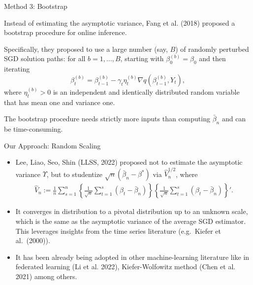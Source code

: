 \documentclass[beamer, t]{beamer}
\newcommand{\tcb}{\textcolor{blue}}
\begin{document}
\begin{frame}{Method 3: Bootstrap}


Instead of estimating the asymptotic variance, Fang et al. (2018) proposed a  bootstrap procedure  for  online inference.

\bigskip
Specifically, they proposed to use a large number (say, $B$) of randomly perturbed
SGD solution paths: for all $b = 1, \ldots, B$, starting with $\beta_0^{(b)} = \beta_0$ and then iterating
\begin{equation*}
\beta_{t}^{(b)}=\beta_{t-1}^{(b)}-\gamma_{t} \eta_t^{(b)} \nabla q\left(\beta_{t-1}^{(b)},Y_{t}\right),
\label{eq:SGD1:bt}
\end{equation*}
where $\eta_t^{(b)} > 0$ is an independent and identically distributed random variable that has mean one and variance one.


\bigskip
The bootstrap procedure needs strictly more inputs than computing $\bar{\beta}_{n}$
and can be time-consuming.

\end{frame}



\begin{frame}{Our Approach: Random Scaling}

\begin{itemize}
	\item Lee, Liao, Seo, Shin (LLSS, 2022) proposed not to estimate the asymptotic variance $\Upsilon$,  but to studentize   $\sqrt{n}\left(\bar{\beta}_{n}-\beta^{*}\right)$ via $ \widehat{V}_{n}^{1/2} $, where
	\begin{align*}\label{def:random-scaling}
	\widehat{V}_{n} := \frac{1}{n}\sum_{s=1}^{n}
	\left\{ \frac{1}{\sqrt{n}} \sum_{t=1}^{s} \left( \beta_{t}-\bar{\beta}_{n} \right) \right \}
	\left\{ \frac{1}{\sqrt{n}} \sum_{t=1}^{s} \left( \beta_{t}-\bar{\beta}_{n} \right) \right \}'.
	\end{align*}
	
	\item
	It converges in distribution to a pivotal distribution up to an unknown scale, which is the same as the asymptotic variance of the average SGD estimator. 
	This leverages insights from the time series literature (e.g.~Kiefer et al.~(2000)).
	
	\item It has been already being adopted in other machine-learning literature like in federated learning (Li et al. 2022), Kiefer-Wolfowitz method (Chen et al. 2021) among others.
	
	
	
	
\end{itemize}





\end{frame}
\end{document}
